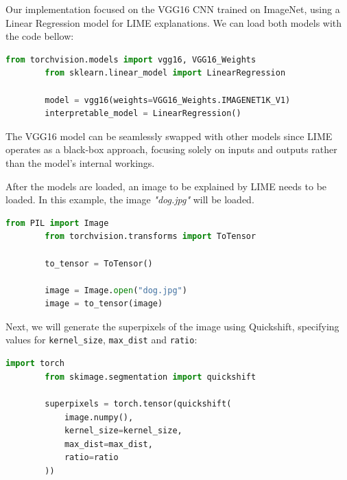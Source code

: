 Our implementation focused on the VGG16 CNN trained on ImageNet, using a Linear Regression model for LIME explanations.
We can load both models with the code bellow:

\begin{program}
    \centering

    \begin{lstlisting}[language=Python, style=wider]
        from torchvision.models import vgg16, VGG16_Weights
        from sklearn.linear_model import LinearRegression

        model = vgg16(weights=VGG16_Weights.IMAGENET1K_V1)
        interpretable_model = LinearRegression()
    \end{lstlisting}
\end{program}


The VGG16 model can be seamlessly swapped with other models since LIME operates as a black-box approach, focusing solely on inputs and outputs rather than the model's internal workings.

After the models are loaded, an image to be explained by LIME needs to be loaded. In this example, the image \emph{"dog.jpg"} will be loaded.

\begin{program}
    \centering

    \begin{lstlisting}[language=Python, style=wider]
        from PIL import Image
        from torchvision.transforms import ToTensor
        
        to_tensor = ToTensor()
        
        image = Image.open("dog.jpg")
        image = to_tensor(image)
    \end{lstlisting}
\end{program}

Next, we will generate the superpixels of the image using Quickshift, specifying values for \texttt{kernel\_size}, \texttt{max\_dist} and \texttt{ratio}:

\begin{program}
    \centering

    \begin{lstlisting}[language=Python, style=wider]
        import torch
        from skimage.segmentation import quickshift
        
        superpixels = torch.tensor(quickshift(
            image.numpy(), 
            kernel_size=kernel_size, 
            max_dist=max_dist, 
            ratio=ratio
        ))
    \end{lstlisting}
\end{program}

